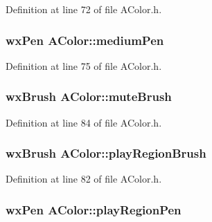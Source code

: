 Definition at line 72 of file A\+Color.\+h.

\subsubsection[{\texorpdfstring{medium\+Pen}{mediumPen}}]{\setlength{\rightskip}{0pt plus 5cm}wx\+Pen A\+Color\+::medium\+Pen\hspace{0.3cm}{\ttfamily [static]}}\hypertarget{class_a_color_a617898331e16a7c6151cbff1d75d7b84}{}\label{class_a_color_a617898331e16a7c6151cbff1d75d7b84}


Definition at line 75 of file A\+Color.\+h.

\subsubsection[{\texorpdfstring{mute\+Brush}{muteBrush}}]{\setlength{\rightskip}{0pt plus 5cm}wx\+Brush A\+Color\+::mute\+Brush\hspace{0.3cm}{\ttfamily [static]}}\hypertarget{class_a_color_a537f6a4be264c3fbf454d701cad9d247}{}\label{class_a_color_a537f6a4be264c3fbf454d701cad9d247}


Definition at line 84 of file A\+Color.\+h.

\subsubsection[{\texorpdfstring{play\+Region\+Brush}{playRegionBrush}}]{\setlength{\rightskip}{0pt plus 5cm}wx\+Brush A\+Color\+::play\+Region\+Brush\hspace{0.3cm}{\ttfamily [static]}}\hypertarget{class_a_color_a2ee41c1ba7f52d7a66774c8409b2ff2b}{}\label{class_a_color_a2ee41c1ba7f52d7a66774c8409b2ff2b}


Definition at line 82 of file A\+Color.\+h.

\subsubsection[{\texorpdfstring{play\+Region\+Pen}{playRegionPen}}]{\setlength{\rightskip}{0pt plus 5cm}wx\+Pen A\+Color\+::play\+Region\+Pen\hspace{0.3cm}{\ttfamily [static]}}\hypertarget{class_a_color_ae02f79b262b2def91f1b205865b87f16}{}\label{class_a_color_ae02f79b262b2def91f1b205865b87f16}


